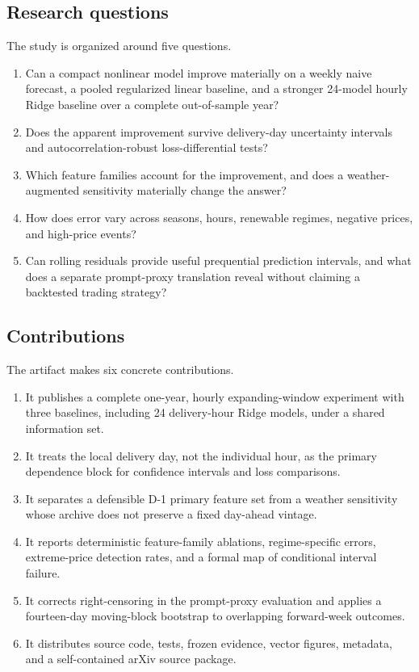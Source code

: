\documentclass[11pt]{article}
\begin{document}
\subsection{Research questions}

The study is organized around five questions.

\begin{enumerate}[leftmargin=*,itemsep=2pt]
  \item Can a compact nonlinear model improve materially on a weekly naive
  forecast, a pooled regularized linear baseline, and a stronger 24-model
  hourly Ridge baseline over a complete out-of-sample year?
  \item Does the apparent improvement survive delivery-day uncertainty
  intervals and autocorrelation-robust loss-differential tests?
  \item Which feature families account for the improvement, and does a
  weather-augmented sensitivity materially change the answer?
  \item How does error vary across seasons, hours, renewable regimes, negative
  prices, and high-price events?
  \item Can rolling residuals provide useful prequential prediction intervals,
  and what does a separate prompt-proxy translation reveal without claiming
  a backtested trading strategy?
\end{enumerate}

\subsection{Contributions}

The artifact makes six concrete contributions.

\begin{enumerate}[leftmargin=*,itemsep=2pt]
  \item It publishes a complete one-year, hourly expanding-window experiment
  with three baselines, including 24 delivery-hour Ridge models, under a
  shared information set.
  \item It treats the local delivery day, not the individual hour, as the
  primary dependence block for confidence intervals and loss comparisons.
  \item It separates a defensible D-1 primary feature set from a weather
  sensitivity whose archive does not preserve a fixed day-ahead vintage.
  \item It reports deterministic feature-family ablations, regime-specific
  errors, extreme-price detection rates, and a formal map of conditional
  interval failure.
  \item It corrects right-censoring in the prompt-proxy evaluation and applies
  a fourteen-day moving-block bootstrap to overlapping forward-week outcomes.
  \item It distributes source code, tests, frozen evidence, vector figures,
  metadata, and a self-contained arXiv source package.
\end{enumerate}
\end{document}
